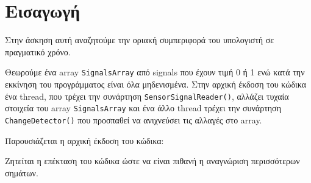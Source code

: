 \chapter{Εισαγωγή}

Στην άσκηση αυτή αναζητούμε την οριακή συμπεριφορά του υπολογιστή σε πραγματικό 
χρόνο.

Θεωρούμε ένα array \lstinline!SignalsArray! από signals που έχουν τιμή 0 
ή 1 ενώ κατά την εκκίνηση του προγράμματος είναι όλα μηδενισμένα. Στην αρχική 
έκδοση του 
κώδικα ένα thread, που τρέχει την συνάρτηση \lstinline!SensorSignalReader()!, 
αλλάζει τυχαία στοιχεία του array 
\lstinline!SignalsArray! και ένα άλλο thread τρέχει την συνάρτηση 
\lstinline!ChangeDetector()! που προσπαθεί να ανιχνεύσει τις αλλαγές στο array.

Παρουσιάζεται η αρχική έκδοση του κώδικα:



Ζητείται η επέκταση του κώδικα ώστε να είναι πιθανή η αναγνώριση περισσότερων 
σημάτων.